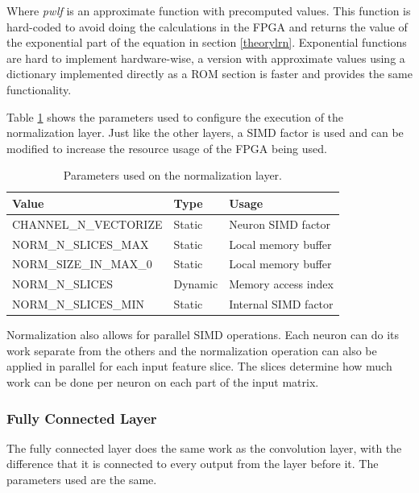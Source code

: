 \begin{enumerate}
Where \textit{pwlf} is an approximate function with precomputed values. This
function is hard-coded to avoid doing the calculations in the FPGA and returns the value
of the exponential part of the equation in section \ref{theorylrn}. Exponential functions
are hard to implement hardware-wise, a version with approximate values using a dictionary
implemented directly as a ROM section is faster and provides the same functionality.

Table \ref{tab:normalizationlayer} shows the parameters used to configure the execution
of the normalization layer. Just like the other layers, a SIMD factor is used and can be
modified to increase the resource usage of the FPGA being used.

\begin{table}[H]
    \begin{center}
        \caption{Parameters used on the normalization layer.}
        \begin{tabular}{lll}
        \hline
        Value                  & Type    & Usage               \\ \hline
        CHANNEL\_N\_VECTORIZE  & Static  & Neuron SIMD factor  \\
        NORM\_N\_SLICES\_MAX   & Static  & Local memory buffer \\
        NORM\_SIZE\_IN\_MAX\_0 & Static  & Local memory buffer \\
        NORM\_N\_SLICES        & Dynamic & Memory access index \\
        NORM\_N\_SLICES\_MIN   & Static  & Internal SIMD factor \\ \hline
        \end{tabular}
        \label{tab:normalizationlayer}
    \end{center}
\end{table}

Normalization also allows for parallel SIMD operations. Each neuron can do its work
separate from the others and the normalization operation can also be applied in parallel
for each input feature slice. The slices determine how much work can be done per neuron
on each part of the input matrix.

\subsubsection{Fully Connected Layer}

The fully connected layer does the same work as the convolution layer, with the difference
that it is connected to every output from the layer before it. The parameters used are the
same.


\end{enumerate}

